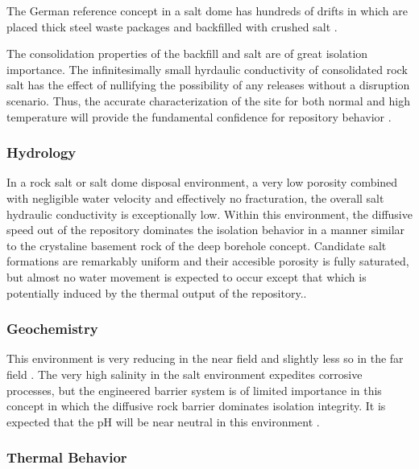 The German reference concept in a salt dome has hundreds of drifts in which 
are placed thick steel waste packages and backfilled with crushed salt 
\cite{von_lensa_red-impact_2008}. 

The consolidation properties of the backfill and salt are of great isolation 
importance. The infinitesimally small hyrdaulic conductivity of consolidated 
rock salt has the effect of nullifying the possibility of any releases without 
a disruption scenario. Thus, the accurate characterization of the site for both 
normal and high temperature will provide the fundamental confidence for 
repository behavior \cite{brewitz_long-term_2002}.


\subsubsection{Hydrology}

In a rock salt or salt dome disposal environment, a very low porosity combined 
with negligible water velocity and effectively no fracturation, the overall 
salt hydraulic conductivity is exceptionally low. Within this environment, the  
diffusive speed out of the repository dominates the isolation behavior in a 
manner similar to the crystaline basement rock of the deep borehole concept. 
Candidate salt formations are remarkably uniform and their accesible porosity is 
fully saturated, but almost no water movement is expected to occur except that 
which is potentially induced by the thermal output of the repository..

\subsubsection{Geochemistry}

This environment is very reducing in the near field and slightly less so in 
the far field \cite{clayton_generic_2011}. The very high salinity in the salt
environment expedites corrosive processes, but the engineered barrier system 
is of limited importance in this concept in which the diffusive rock barrier 
dominates isolation integrity.  It is expected that the pH will be near
neutral in this environment \cite{von_lensa_red-impact_2008, clayton_generic_2011}.

\subsubsection{Thermal Behavior}
\label{subsec:saltthermal}


